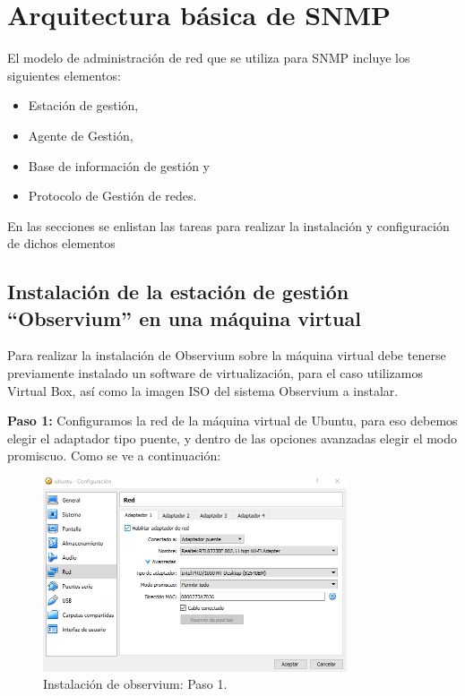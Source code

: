 \section{Arquitectura básica de SNMP}

\noindent
El modelo de administración de red que se utiliza para SNMP incluye los siguientes elementos:
\begin{itemize}
	\item Estación de gestión,
	\item Agente de Gestión,
	\item Base de información de gestión y
	\item Protocolo de Gestión de redes.
\end{itemize}

\noindent
En las secciones se enlistan las tareas para realizar la instalación y configuración de dichos elementos

\subsection{Instalación de la estación de gestión “Observium” en una máquina virtual}

\noindent
Para realizar la instalación de Observium sobre la máquina virtual debe tenerse previamente instalado un software de virtualización, para el caso utilizamos Virtual Box, así como la imagen ISO del sistema Observium a instalar. 

\noindent
\newline
\textbf{Paso 1:} Configuramos la red de la máquina virtual de Ubuntu, para eso debemos elegir el adaptador tipo puente, y dentro de las opciones avanzadas elegir el modo promiscuo. Como se ve a continuación: 

\pagebreak
\begin{figure}[htbp!]
	\centering
		\includegraphics[width=0.8\textwidth]{images/desarrollo/instalarObservium_paso1.png}
	\caption{Instalación de observium: Paso 1.}
\end{figure}

